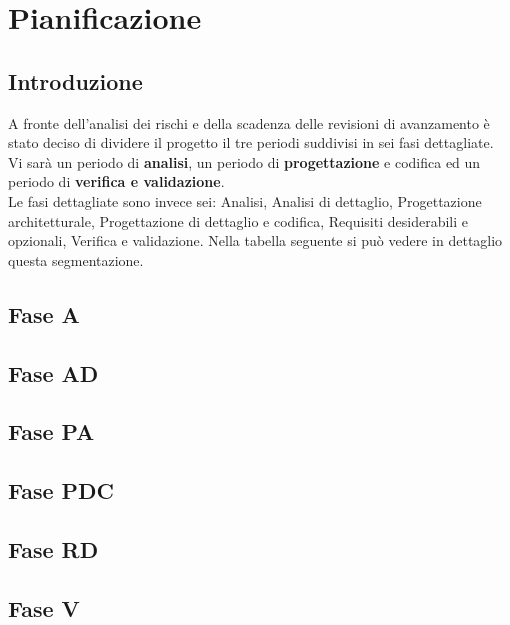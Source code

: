\section{Pianificazione} 
	\subsection{Introduzione}
	A fronte dell'analisi dei rischi e della scadenza delle revisioni di avanzamento è stato deciso di dividere il progetto il tre periodi suddivisi in sei fasi dettagliate.
	Vi sarà un periodo di \textbf{analisi}, un periodo di \textbf{progettazione} e codifica ed un periodo di \textbf{verifica e validazione}. \\ Le fasi dettagliate sono invece sei: Analisi, Analisi di dettaglio, Progettazione architetturale, Progettazione di dettaglio e codifica, Requisiti desiderabili e opzionali, Verifica e validazione. 
	Nella tabella seguente si può vedere in dettaglio questa segmentazione. 
	
	\subsection{Fase A}
	\subsection{Fase AD}
	\subsection{Fase PA}
	\subsection{Fase PDC}
	\subsection{Fase RD}
	\subsection{Fase V}
	
